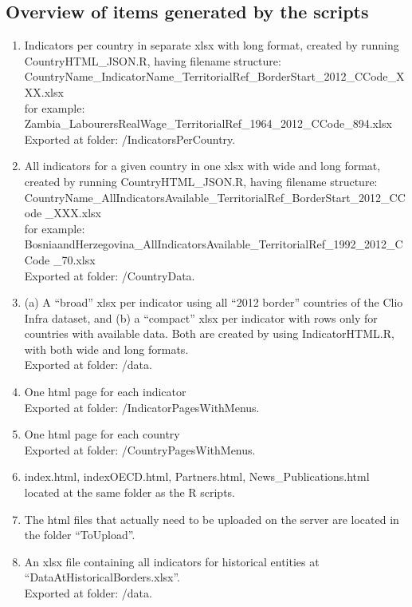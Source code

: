 \documentclass[a4paper]{article}
\begin{document}
\subsection{Overview of items generated by the scripts}

\begin{enumerate}
 \item Indicators per country in separate xlsx with long format, created by 
running CountryHTML\_JSON.R, having filename structure:\\
CountryName\_IndicatorName\_TerritorialRef\_BorderStart\_2012\_CCode\_XXX.xlsx\\
for example: 
Zambia\_LabourersRealWage\_TerritorialRef\_1964\_2012\_CCode\_894.xlsx\\
Exported at folder: /IndicatorsPerCountry.

 \item All indicators for a given country in one xlsx with wide and long 
format, created by running CountryHTML\_JSON.R, having filename structure:\\
CountryName\_AllIndicatorsAvailable\_TerritorialRef\_BorderStart\_2012\_CCode
\_XXX.xlsx\\ for example:
BosniaandHerzegovina\_AllIndicatorsAvailable\_TerritorialRef\_1992\_2012\_CCode
\_70.xlsx \\
Exported at folder: /CountryData.

 \item (a) A ``broad'' xlsx per indicator using all ``2012 border'' countries 
of the Clio Infra dataset, and (b) a ``compact'' xlsx per indicator with rows 
only for countries with available data. Both are created by using 
IndicatorHTML.R, with both wide and long formats.\\
Exported at folder: /data.

 \item One html page for each indicator\\
Exported at folder: /IndicatorPagesWithMenus.

 \item One html page for each country\\
Exported at folder: /CountryPagesWithMenus.

 \item index.html, indexOECD.html, Partners.html, News\_Publications.html 
located at the same folder as the R scripts.
  
 \item The html files that actually need to be uploaded on the server are 
located in the folder ``ToUpload''.

\item An xlsx file containing all indicators for historical entities at 
``DataAtHistoricalBorders.xlsx''.\\
Exported at folder: /data.
 
\end{enumerate}
\end{document}
